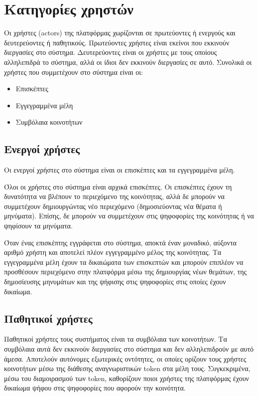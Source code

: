 \section{Κατηγορίες χρηστών} \label{section:3-4-user-categories}

Οι χρήστες (actors) της πλατφόρμας χωρίζονται σε πρωτεύοντες ή ενεργούς και δευτερεύοντες ή παθητικούς. Πρωτεύοντες χρήστες είναι εκείνοι που εκκινούν διεργασίες στο σύστημα. Δευτερεύοντες είναι οι χρήστες με τους οποίους αλληλεπιδρά το σύστημα, αλλά οι ίδιοι δεν εκκινούν διεργασίες σε αυτό. Συνολικά οι χρήστες που συμμετέχουν στο σύστημα είναι οι:

\begin{itemize}
    \item Επισκέπτες
    \item Εγγεγραμμένα μέλη
    \item Συμβόλαια κοινοτήτων
\end{itemize}

\subsection{Ενεργοί χρήστες}

Οι ενεργοί χρήστες στο σύστημα είναι οι επισκέπτες και τα εγγεγραμμένα μέλη.

Όλοι οι χρήστες στο σύστημα είναι αρχικά επισκέπτες. Οι επισκέπτες έχουν τη δυνατότητα να βλέπουν το περιεχόμενο της κοινότητας, αλλά δε μπορούν να συμμετέχουν δημιουργώντας νέο περιεχόμενο (δημοσιεύοντας νέα θέματα ή μηνύματα). Επίσης, δε μπορούν να συμμετέχουν στις ψηφοφορίες της κοινότητας ή να ψηφίσουν τα μηνύματα.

Όταν ένας επισκέπτης εγγράφεται στο σύστημα, αποκτά έναν μοναδικό, αύξοντα αριθμό χρήστη και αποτελεί πλέον εγγεγραμμένο μέλος της κοινότητας. Τα εγγεγραμμένα μέλη έχουν τα δικαιώματα των επισκεπτών και μπορούν επιπλέον να προσθέσουν περιεχόμενο στην πλατφόρμα μέσω της δημιουργίας νέων θεμάτων, της δημοσίευσης μηνυμάτων και της ψήφισης στις ψηφοφορίες στις οποίες έχουν δικαίωμα.

\subsection{Παθητικοί χρήστες}

Παθητικοί χρήστες τους συστήματος είναι τα συμβόλαια των κοινοτήτων. Τα συμβόλαια αυτά δεν εκκινούν διεργασίες στο σύστημα και δεν αλληλεπιδρούν με αυτό άμεσα. Αποτελούν αυτόνομες εξωτερικές οντότητες, οι οποίες ορίζουν τους χρήστες κοινοτήτων μέσω της διάθεσης αναγνωριστικών token στα μέλη τους. Συγκεκριμένα, μέσω του διαμοιρασμού των token, καθορίζουν ποιοι χρήστες της πλατφόρμας έχουν δικαίωμα ψήφου στις ψηφοφορίες που αφορούν την κοινότητα.


